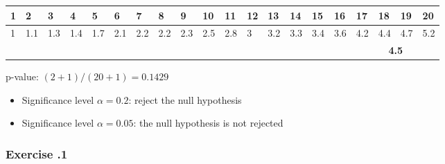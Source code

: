 \begin{table}[H]
\centering
\tiny
\begin{tabular}{llllllllllllllllllll}
\hline
\multicolumn{1}{|l|}{1} & \multicolumn{1}{l|}{2}   & \multicolumn{1}{l|}{3}   & \multicolumn{1}{l|}{4}   & \multicolumn{1}{l|}{5}   & \multicolumn{1}{l|}{6}   & \multicolumn{1}{l|}{7}   & \multicolumn{1}{l|}{8}   & \multicolumn{1}{l|}{9}   & \multicolumn{1}{l|}{10}  & \multicolumn{1}{l|}{11}  & \multicolumn{1}{l|}{12} & \multicolumn{1}{l|}{13}  & \multicolumn{1}{l|}{14}  & \multicolumn{1}{l|}{15}  & \multicolumn{1}{l|}{16}  & \multicolumn{1}{l|}{17}  & \multicolumn{1}{l|}{18}  & \multicolumn{1}{l|}{19}  & \multicolumn{1}{l|}{20}  \\ \hline
\multicolumn{1}{|l|}{1} & \multicolumn{1}{l|}{1.1} & \multicolumn{1}{l|}{1.3} & \multicolumn{1}{l|}{1.4} & \multicolumn{1}{l|}{1.7} & \multicolumn{1}{l|}{2.1} & \multicolumn{1}{l|}{2.2} & \multicolumn{1}{l|}{2.2} & \multicolumn{1}{l|}{2.3} & \multicolumn{1}{l|}{2.5} & \multicolumn{1}{l|}{2.8} & \multicolumn{1}{l|}{3}  & \multicolumn{1}{l|}{3.2} & \multicolumn{1}{l|}{3.3} & \multicolumn{1}{l|}{3.4} & \multicolumn{1}{l|}{3.6} & \multicolumn{1}{l|}{4.2} & \multicolumn{1}{l|}{4.4} & \multicolumn{1}{l|}{4.7} & \multicolumn{1}{l|}{5.2} \\ \hline
                        &                          &                          &                          &                          &                          &                          &                          &                          &                          &                          &                         &                          &                          &                          &                          &                          & \multicolumn{2}{c}{\textbf{4.5}}                             &                         
\end{tabular}
\end{table}

p-value: $(2 + 1) / (20 + 1) = 0.1429$

\begin{itemize}
\item Significance level $\alpha = 0.2$:  reject the null hypothesis
\item Significance level $\alpha = 0.05$: the null hypothesis is not rejected
\end{itemize}

%
%
\subsubsection*{Exercise \thesection.1}

